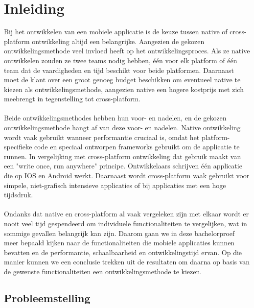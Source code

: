 
\chapter{Inleiding}
\label{ch:inleiding}

Bij het ontwikkelen van een mobiele applicatie is de keuze tussen native of cross-platform ontwikkeling altijd een belangrijke. 
Aangezien de gekozen ontwikkelingsmethode veel invloed heeft op het ontwikkelingsproces. 
Als ze native ontwikkelen zouden ze twee teams nodig hebben, één voor elk platform of één team dat de vaardigheden en tijd beschikt voor beide platformen. 
Daarnaast moet de klant over een groot genoeg budget beschikken om eventueel native te kiezen als ontwikkelingsmethode, 
aangezien native een hogere kostprijs met zich meebrengt in tegenstelling tot cross-platform.
\\\\
Beide ontwikkelingsmethodes hebben hun voor- en nadelen, en de gekozen ontwikkelingsmethode hangt af van deze voor- en nadelen. 
Native ontwikkeling wordt vaak gebruikt wanneer performantie cruciaal is, 
omdat het platform-specifieke code en speciaal ontworpen frameworks gebruikt om de applicatie te runnen. 
In vergelijking met cross-platform ontwikkeling dat gebruik maakt van een "write once, run anywhere" principe. 
Ontwikkelaars schrijven één applicatie die op IOS en Android werkt. 
Daarnaast wordt cross-platform vaak gebruikt voor simpele, niet-grafisch intensieve applicaties of bij applicaties met een hoge tijdsdruk.
\\\\
Ondanks dat native en cross-platform al vaak vergeleken zijn met elkaar wordt er nooit veel tijd gespendeerd om 
individuele functionaliteiten te vergelijken, wat in sommige gevallen belangrijk kan zijn.
Daarom gaan we in deze bachelorproef meer bepaald kijken naar de functionaliteiten 
die mobiele applicaties kunnen bevatten en de performantie, schaalbaarheid en ontwikkelingstijd ervan. 
Op die manier kunnen we een conclusie trekken uit de resultaten om daarna op basis van de gewenste functionaliteiten een ontwikkelingsmethode te kiezen.


\section{Probleemstelling}%
\label{sec:probleemstelling}

